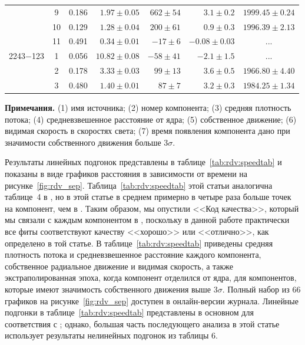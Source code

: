 \begin{table}
\begin{SingleSpace}
\begin{tabular}{l c r r r r c}
         &  9 &  0.186 & $ 1.97\pm 0.05$ & $ 662\pm  54$ & $  3.1\pm 0.2$ & $1999.45\pm   0.24$ \\
         & 10 &  0.129 & $ 1.28\pm 0.04$ & $ 200\pm  61$ & $  0.9\pm 0.3$ & $1996.39\pm   2.13$ \\
         & 11 &  0.491 & $ 0.34\pm 0.01$ & $ -17\pm   6$ & $ -0.08\pm 0.03$ & ... \\
2243$-$123 &  1 &  0.056 & $10.82\pm 0.08$ & $ -58\pm  41$ & $ -2.1\pm 1.5$ & ... \\
         &  2 &  0.178 & $ 3.33\pm 0.03$ & $  99\pm  13$ & $  3.6\pm 0.5$ & $1966.80\pm   4.40$ \\
         &  3 &  0.480 & $ 1.40\pm 0.01$ & $  87\pm   7$ & $  3.2\pm 0.3$ & $1984.25\pm   1.34$ \\

\bottomrule
\end{tabular}
\end{SingleSpace}
\textbf{Примечания.} (1) имя источника; (2) номер компонента; (3) средняя плотность потока;
(4) средневзвешенное расстояние от ядра; (5) собственное движение; (6) видимая скорость в скоростях
света; (7) время появления компонента дано при значимости собственного движения больше 3$\sigma$.
\end{table}

Результаты линейных подгонок представлены в таблице~\ref{tab:rdv:speedtab} и показаны в виде
графиков расстояния в зависимости от времени на рисунке~\ref{fig:rdv_sep}.
Таблица~\ref{tab:rdv:speedtab} этой статьи аналогична таблице~4 в \cite{Piner_2007}, но в этой
статье в среднем примерно в четыре раза больше точек на компонент, чем в \cite{Piner_2007}. Таким
образом, мы опустили <<Код качества>>, который мы связали с каждым компонентом в \cite{Piner_2007},
поскольку в данной работе практически все фиты соответствуют качеству <<хорошо>> или <<отлично>>,
как определено в той статье. В таблице~\ref{tab:rdv:speedtab} приведены средняя плотность потока и
средневзвешенное расстояние каждого компонента, собственное радиальное движение и видимая скорость,
а также экстраполированная эпоха, когда компонент отделился от ядра, для компонентов, которые имеют
значимость собственного движения выше $3\sigma$. Полный набор из 66 графиков на
рисунке~\ref{fig:rdv_sep} доступен в онлайн-версии журнала. Линейные подгонки в
таблице~\ref{tab:rdv:speedtab} представлены в основном для соответствия с \cite{Piner_2007}; однако,
большая часть последующего анализа в этой статье использует результаты нелинейных подгонок из
таблицы 6.

